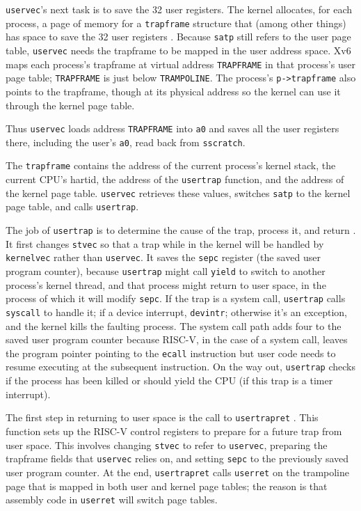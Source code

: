 {\tt uservec}'s next task is to save the 32 user registers.
The kernel allocates, for each process, a page of memory for a
{\tt trapframe} structure that (among other things) has space to
save the 32 user registers
. Because {\tt satp} still
refers to the user page table, {\tt uservec} needs the trapframe to be
mapped in the user address space. Xv6 maps each process's trapframe
at virtual address {\tt TRAPFRAME} in that process's user page table;
{\tt TRAPFRAME} is
just below {\tt TRAMPOLINE}. The process's {\tt p->trapframe} also
points to the
trapframe, though at its physical address so the kernel can use it
through the kernel page table.

Thus {\tt uservec} loads address {\tt TRAPFRAME} into {\tt a0}
and saves all the user registers there,
including the user's {\tt a0}, read back from {\tt sscratch}.

The {\tt trapframe} contains the address of the current process's
kernel stack, the current CPU's hartid, the address of the {\tt usertrap}
function,
and the address of the kernel page table. {\tt uservec}
retrieves these values, switches {\tt satp} to the kernel page table,
and calls {\tt usertrap}.

The job of {\tt usertrap} is to determine
the cause of the trap, process it, and return
.
It first changes {\tt stvec} so
that a trap while in the kernel will be handled by
{\tt kernelvec} rather than {\tt uservec}.
It saves the {\tt sepc} register (the saved user program counter),
because 
{\tt usertrap} might call \lstinline{yield} to switch
to another process's kernel thread, and that process might return
to user space, in the process of which it will modify \lstinline{sepc}.
If the trap is a system call, {\tt usertrap} calls {\tt syscall} to
handle it;
if a device interrupt, {\tt devintr};
otherwise it's an exception, and the kernel kills the
faulting process.
The system call path adds four to the saved user program counter
because RISC-V, in the case of a system call,
leaves the program pointer pointing to the {\tt ecall} instruction
but user code needs to resume executing at the subsequent instruction.
On the way out, {\tt usertrap} checks if the process has been
killed or should yield the CPU (if this trap is a timer interrupt).

The first step in returning to user space is the call to {\tt usertrapret}
.
This function sets up the RISC-V control registers to prepare for a
future trap from user space. This involves changing {\tt stvec}
to refer to {\tt uservec}, preparing the trapframe fields that
{\tt uservec} relies on, and setting {\tt sepc} to the previously
saved user program counter. At the end, {\tt usertrapret}
calls {\tt userret} on the trampoline page that is mapped in
both user and kernel page tables; the reason is that assembly
code in {\tt userret} will switch page tables.

